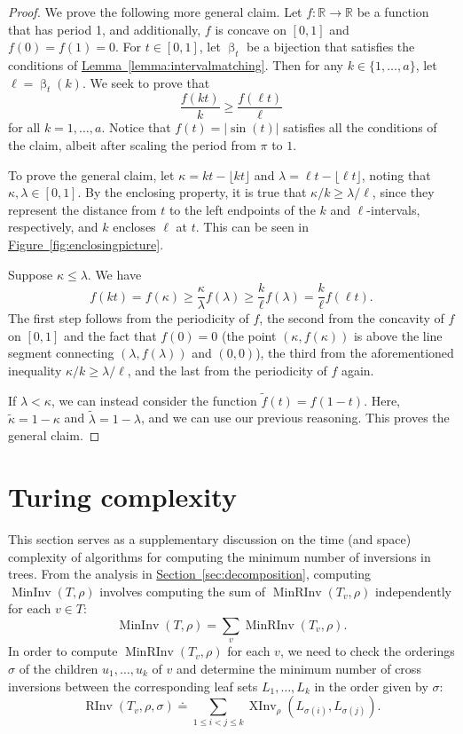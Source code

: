 \documentclass[11pt]{article}
\numberwithin{equation}{section}
\theoremstyle{definition}
\theoremstyle{plain}
\newcommand{\expref}[2]{\hyperref[#2]{#1~\ref{#2}}}
\newcommand{\ranking}{\rho}
\newcommand{\ordering}{\sigma}
\DeclareMathOperator{\XInv}{XInv}
\DeclareMathOperator{\MInv}{MinInv}
\DeclareMathOperator{\MRInv}{MinRInv}
\DeclareMathOperator{\RInv}{RInv}
\DeclareMathOperator{\bij}{\beta}
\begin{document}
\begin{proof}
    We prove the following more general claim. Let $f:\mathbb{R}\to\mathbb{R}$ be a function that has period 1, and additionally, $f$ is concave on $[0,1]$ and $f(0)=f(1)=0$. For $t\in [0,1]$, let $\bij_t$ be a bijection that satisfies the conditions of \expref{Lemma}{lemma:intervalmatching}. Then for any $k\in \{1,\dots,a\}$, let $\ell=\bij_t(k)$. We seek to prove that 
    \[\frac{f(kt)}{k}\ge \frac{f(\ell t)}{\ell} \]
    for all $k=1,\dots,a$. Notice that $f(t)=\lvert\sin(t)\rvert$ satisfies all the conditions of the claim, albeit after scaling the period from $\pi$ to $1$.
    
    To prove the general claim, let $\kappa=kt-\lfloor kt\rfloor$ and $\lambda=\ell t-\lfloor \ell t\rfloor$, noting that $\kappa,\lambda\in [0,1]$. By the enclosing property, it is true that $\kappa/k \ge \lambda/\ell$, since they represent the distance from $t$ to the left endpoints of the $k$ and $\ell$-intervals, respectively, and $k$ encloses $\ell$ at $t$. This can be seen in \expref{Figure}{fig:enclosingpicture}.
    
    Suppose $\kappa\le \lambda$. We have 
    \[f(kt)=f(\kappa) \ge \frac{\kappa}{\lambda}f(\lambda)\ge \frac{k}{\ell}f(\lambda)=\frac{k}{\ell}f(\ell t). \]
    The first step follows from the periodicity of $f$, the second from the concavity of $f$ on $[0,1]$ and the fact that $f(0)=0$ (the point $(\kappa,f(\kappa))$ is above the line segment connecting $(\lambda,f(\lambda))$ and $(0,0)$), the third from the aforementioned inequality $\kappa/k \ge \lambda/\ell$, and the last from the periodicity of $f$ again. 
    
    If $\lambda<\kappa$, we can instead consider the function $\widetilde{f}(t)=f(1-t)$. Here, $\widetilde{\kappa}=1-\kappa$ and $\widetilde{\lambda}=1-\lambda$, and we can use our previous reasoning. This proves the general claim.
\end{proof}



\section{Turing complexity}
\label{sec:turing}

This section serves as a supplementary discussion on the time (and space) complexity of algorithms for computing the minimum number of inversions in trees. From the analysis in \expref{Section}{sec:decomposition}, computing $\MInv(T,\ranking)$ involves computing the sum of $\MRInv(T_v,\ranking)$ independently for each $v\in T$:
\begin{equation*}
   \MInv(T,\ranking) = \sum_v \MRInv(T_v,\ranking).
\end{equation*}
In order to compute $\MRInv(T_v,\ranking)$ for each $v$, we need to check the orderings $\ordering$ of the children $u_1, \dots, u_k$ of $v$ and determine the minimum number of cross inversions between the corresponding leaf sets $L_1,\dots,L_k$ in the order given by $\ordering$:
\begin{equation*}
    \RInv(T_v,\ranking,\ordering) \doteq \sum_{1 \le i < j \le k} \XInv_\ranking(L_{\ordering(i)},L_{\ordering(j)}).
\end{equation*}
\end{document}

